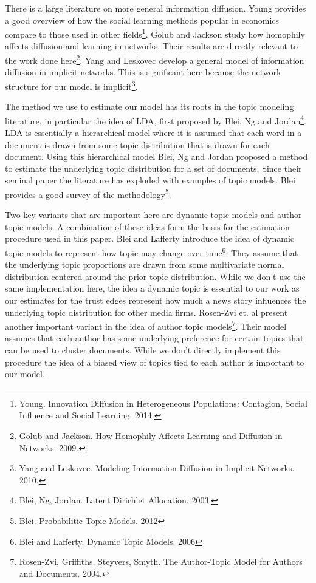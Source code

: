 \documentclass[a4paper]{article}
\begin{document}
There is a large literature on more general information diffusion.  Young provides a good overview of how the social learning methods popular in economics compare to those used in other fields\footnote{Young.  Innovation Diffusion in Heterogeneous Populations: Contagion, Social Influence and Social Learning.  2014.}.  Golub and Jackson study how homophily affects diffusion and learning in networks.  Their results are directly relevant to the work done here\footnote{Golub and Jackson.  How Homophily Affects Learning and Diffusion in Networks. 2009.}.
 Yang and Leskovec develop a general model of information diffusion in implicit networks.  This is significant here because the network structure for our model is implicit\footnote{Yang and Leskovec.  Modeling Information Diffusion in Implicit Networks.  2010.}.

The method we use to estimate our model has its roots in the topic modeling literature, in particular the idea of LDA, first proposed by Blei, Ng and Jordan\footnote{Blei, Ng, Jordan. Latent Dirichlet Allocation. 2003.}.  LDA is essentially a hierarchical model where it is assumed that each word in a document is drawn from some topic distribution that is drawn for each document.  Using this hierarchical model Blei, Ng and Jordan proposed a method to estimate the underlying topic distribution for a set of documents.  Since their seminal paper the literature has exploded with examples of topic models.  Blei provides a good survey of the methodology\footnote{Blei.  Probabilitic Topic Models. 2012}.

Two key variants that are important here are dynamic topic models and author topic models.  A combination of these ideas form the basis for the estimation procedure used in this paper.  Blei
and Lafferty introduce the idea of dynamic topic models to represent how topic may change over time\footnote{Blei and Lafferty.  Dynamic Topic Models. 2006}.  They assume that the underlying topic proportions are drawn from some multivariate normal distribution centered around the prior topic distribution.  While we don't use the same implementation here, the idea a dynamic topic is essential to our work as our estimates for the trust edges represent how much a news story influences the underlying topic distribution for other media firms.  Rosen-Zvi et. al present another important variant in the idea of author topic models\footnote{Rosen-Zvi, Griffiths, Steyvers, Smyth.  The Author-Topic Model for Authors and Documents. 2004.}.  Their model assumes that each author has some underlying preference for certain topics that can be used to cluster documents.  While we don't directly implement this procedure the idea of a biased view of topics tied to each author is important to our model.
\end{document}
